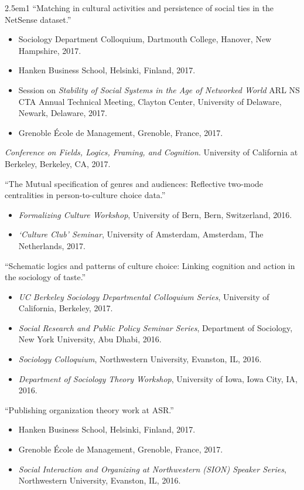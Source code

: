 \documentclass[
]{article}
\providecommand{\tightlist}{%
  \setlength{\itemsep}{0pt}\setlength{\parskip}{0pt}}
\newenvironment{cventry}{\begin{hangparas}{2.5em}{1}}{\end{hangparas}}
\begin{document}
\begin{cventry}
``Matching in cultural activities and persistence of social ties in the
NetSense dataset.''

\begin{itemize}
\tightlist
\item
  Sociology Department Colloquium, Dartmouth College, Hanover, New
  Hampshire, 2017.
\item
  Hanken Business School, Helsinki, Finland, 2017.
\item
  Session on \emph{Stability of Social Systems in the Age of Networked
  World} ARL NS CTA Annual Technical Meeting, Clayton Center, University
  of Delaware, Newark, Delaware, 2017.
\item
  Grenoble École de Management, Grenoble, France, 2017.
\end{itemize}

\emph{Conference on Fields, Logics, Framing, and Cognition}. University
of California at Berkeley, Berkeley, CA, 2017.

``The Mutual specification of genres and audiences: Reflective two-mode
centralities in person-to-culture choice data.''

\begin{itemize}
\tightlist
\item
  \emph{Formalizing Culture Workshop}, University of Bern, Bern,
  Switzerland, 2016.
\item
  \emph{`Culture Club' Seminar}, University of Amsterdam, Amsterdam, The
  Netherlands, 2017.
\end{itemize}

``Schematic logics and patterns of culture choice: Linking cognition and
action in the sociology of taste.''

\begin{itemize}
\tightlist
\item
  \emph{UC Berkeley Sociology Departmental Colloquium Series},
  University of California, Berkeley, 2017.
\item
  \emph{Social Research and Public Policy Seminar Series}, Department of
  Sociology, New York University, Abu Dhabi, 2016.
\item
  \emph{Sociology Colloquium}, Northwestern University, Evanston, IL,
  2016.
\item
  \emph{Department of Sociology Theory Workshop}, University of Iowa,
  Iowa City, IA, 2016.
\end{itemize}

``Publishing organization theory work at ASR.''

\begin{itemize}
\tightlist
\item
  Hanken Business School, Helsinki, Finland, 2017.
\item
  Grenoble École de Management, Grenoble, France, 2017.
\item
  \emph{Social Interaction and Organizing at Northwestern (SION) Speaker
  Series}, Northwestern University, Evanston, IL, 2016.
\end{itemize}


\end{cventry}
\end{document}
